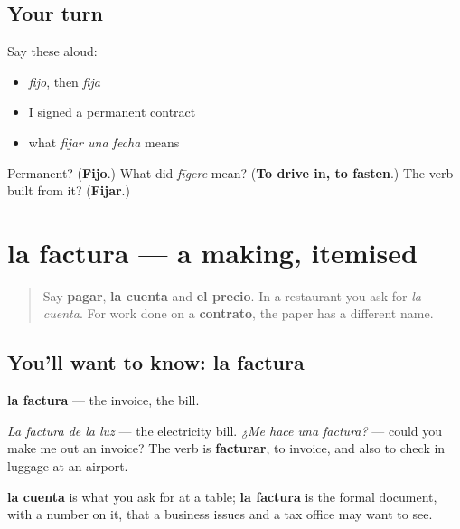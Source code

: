 \subsection*{Your turn}
Say these aloud:

\begin{itemize}
\raggedright
  \item \emph{fijo}, then \emph{fija}
  \item I signed a permanent contract
  \item what \emph{fijar una fecha} means
\end{itemize}

\begin{tcolorbox}[breakable,colback=teal!4,colframe=teal!35!black,title={Before you move on}]
Permanent? (\textbf{Fijo}.) What did \emph{fīgere} mean? (\textbf{To drive in, to fasten}.) The verb built from it? (\textbf{Fijar}.)
\end{tcolorbox}
\section[la factura]{la factura — a making, itemised}

\label{lesson:ES-C441-factura}



\begin{quote}
Say \textbf{pagar}, \textbf{la cuenta} and \textbf{el precio}. In a restaurant you ask for \emph{la cuenta}. For work done on a \textbf{contrato}, the paper has a different name.
\end{quote}

\subsection*{You'll want to know: la factura}
\textbf{la factura} — the invoice, the bill.

\emph{La factura de la luz} — the electricity bill. \emph{¿Me hace una factura?} — could you make me out an invoice? The verb is \textbf{facturar}, to invoice, and also to check in luggage at an airport.

\textbf{la cuenta} is what you ask for at a table; \textbf{la factura} is the formal document, with a number on it, that a business issues and a tax office may want to see.

